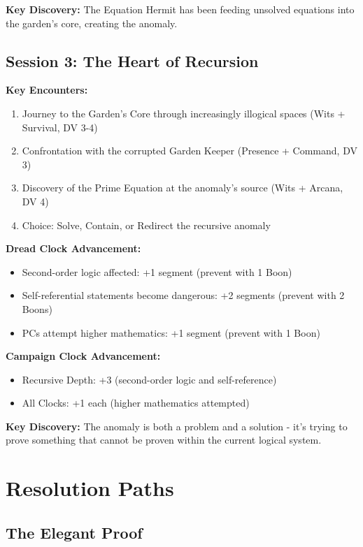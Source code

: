 \documentclass[11pt]{article}
\begin{document}
\textbf{Key Discovery:} The Equation Hermit has been feeding unsolved equations into the garden's core, creating the anomaly.

\subsection{Session 3: The Heart of Recursion}

\textbf{Key Encounters:}
\begin{enumerate}
\item Journey to the Garden's Core through increasingly illogical spaces (Wits + Survival, DV 3-4)
\item Confrontation with the corrupted Garden Keeper (Presence + Command, DV 3)
\item Discovery of the Prime Equation at the anomaly's source (Wits + Arcana, DV 4)
\item Choice: Solve, Contain, or Redirect the recursive anomaly
\end{enumerate}

\textbf{Dread Clock Advancement:}
\begin{itemize}
\item Second-order logic affected: +1 segment (prevent with 1 Boon)
\item Self-referential statements become dangerous: +2 segments (prevent with 2 Boons)
\item PCs attempt higher mathematics: +1 segment (prevent with 1 Boon)
\end{itemize}

\textbf{Campaign Clock Advancement:}
\begin{itemize}
\item Recursive Depth: +3 (second-order logic and self-reference)
\item All Clocks: +1 each (higher mathematics attempted)
\end{itemize}

\textbf{Key Discovery:} The anomaly is both a problem and a solution - it's trying to prove something that cannot be proven within the current logical system.

\section{Resolution Paths}

\subsection{The Elegant Proof}
\end{document}
